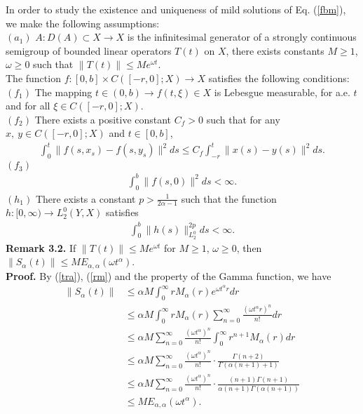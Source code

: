 \documentclass[12pt,a4paper,oneside,reqno,notitlepage]{amsart}
\theoremstyle{plain}
\numberwithin{equation}{section}
\begin{document}
In order to study the existence and uniqueness of mild solutions of Eq. (\ref{fbm}), we make the following assumptions:\\
$(a_{1})$ $A: D(A)\subset X\rightarrow X$ is the infinitesimal generator of a strongly continuous semigroup of bounded linear operators $T(t)$ on $X$, there exists constants $M\geq 1$, $\omega\geq 0$ such that $\|T(t)\|\leq Me^{\omega t}.$\\
The function $f:[0,b]\times C([-r,0];X)\rightarrow X$  satisfies the following conditions:\\
$(f_{1})$ The mapping $t\in(0,b)\rightarrow f(t,\xi)\in X$ is Lebesgue measurable, for a.e. $t$ and for all $\xi\in C([-r,0];X)$.\\
$(f_{2})$ There exists a positive constant $C_{f}>0$ such that for any  $x,\ y\in C([-r,0];X)$ and $t\in [0,b]$,
\begin{align*}
\int_{0}^{t}\|f(s,x_{s})-f(s,y_{s})\|^{2}ds\leq C_{f}\int_{-r}^{t}\|x(s)-y(s)\|^{2}ds.
\end{align*}
$(f_{3})$
\begin{align*}
\int_{0}^{b}\|f(s,0)\|^{2}ds<\infty.
\end{align*}
$(h_{1})$ There exists a constant $p>\frac{1}{2\alpha-1}$ such that the function $h: [0,\infty)\rightarrow L_{2}^{0}(Y,X)$ satisfies
\begin{align*}
\int_{0}^{b}\|h(s)\|_{L_{2}^{0}}^{2p}ds<\infty.
\end{align*}
\textbf{Remark 3.2.}  If $\|T(t)\|\leq Me^{\omega t}$ for $M\geq 1$, $\omega\geq 0$, then
$\|S_{\alpha}(t)\|\leq ME_{\alpha,\alpha}(\omega t^{\alpha})$. \\
\textbf{Proof.} By (\ref{tra}), (\ref{rm}) and the property of the Gamma function,  we have
\begin{align*}
\|S_{\alpha}(t)\|&\leq \alpha M\int_{0}^{\infty}rM_{\alpha}(r)e^{\omega t^{\alpha}r}dr\\
&\leq \alpha M\int_{0}^{\infty}rM_{\alpha}(r)\sum_{n=0}^{\infty}\frac{(\omega t^{\alpha}r)^{n}}{n!}dr\\
&\leq \alpha M\sum_{n=0}^{\infty}\frac{(\omega t^{\alpha})^{n}}{n!}\int_{0}^{\infty}r^{n+1}M_{\alpha}(r)dr\\
&\leq \alpha M\sum_{n=0}^{\infty}\frac{(\omega t^{\alpha})^{n}}{n!}\cdot \frac{\Gamma(n+2)}{\Gamma(\alpha(n+1)+1)}\\
&\leq \alpha M\sum_{n=0}^{\infty}\frac{(\omega t^{\alpha})^{n}}{n!}\cdot \frac{(n+1)\Gamma(n+1)}{\alpha(n+1)\Gamma(\alpha(n+1))}\\
&\leq M E_{\alpha,\alpha}(\omega t^{\alpha}).
\end{align*}
\end{document}
